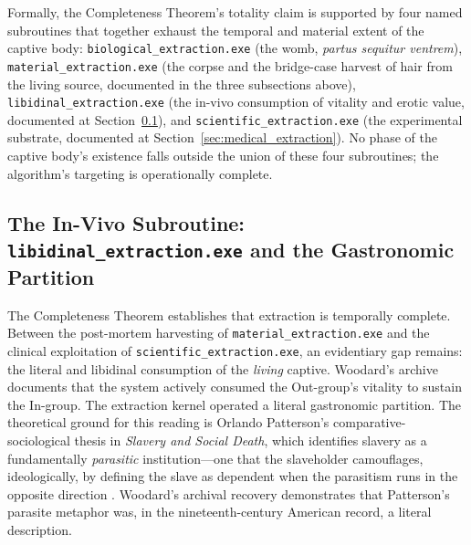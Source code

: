 Formally, the Completeness Theorem's totality claim is supported by four named subroutines that together exhaust the temporal and material extent of the captive body: \texttt{biological\_extraction.exe} (the womb, \textit{partus sequitur ventrem}), \texttt{material\_extraction.exe} (the corpse and the bridge-case harvest of hair from the living source, documented in the three subsections above), \texttt{libidinal\_extraction.exe} (the in-vivo consumption of vitality and erotic value, documented at Section~\ref{subsec:libidinal_extraction}), and \texttt{scientific\_extraction.exe} (the experimental substrate, documented at Section~\ref{sec:medical_extraction}). No phase of the captive body's existence falls outside the union of these four subroutines; the algorithm's targeting is operationally complete.

\subsection{The In-Vivo Subroutine: \texttt{libidinal\_extraction.exe} and the Gastronomic Partition}
\label{subsec:libidinal_extraction}

The Completeness Theorem establishes that extraction is temporally complete. Between the post-mortem harvesting of \texttt{material\_extraction.exe} and the clinical exploitation of \texttt{scientific\_extraction.exe}, an evidentiary gap remains: the literal and libidinal consumption of the \textit{living} captive. Woodard's archive documents that the system actively consumed the Out-group's vitality to sustain the In-group. The extraction kernel operated a literal gastronomic partition. The theoretical ground for this reading is Orlando Patterson's comparative-sociological thesis in \textit{Slavery and Social Death}, which identifies slavery as a fundamentally \textit{parasitic} institution---one that the slaveholder camouflages, ideologically, by defining the slave as dependent when the parasitism runs in the opposite direction \cite{patterson_slavery, woodard_delectable}. Woodard's archival recovery demonstrates that Patterson's parasite metaphor was, in the nineteenth-century American record, a literal description.

